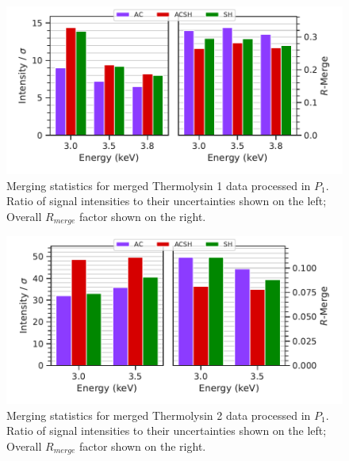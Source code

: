 \begin{figure}[]
    \centering
    \includegraphics{plots/exp1/tlys_9_P1/merged_stats.pdf}
    \caption{Merging statistics for merged Thermolysin 1 data processed in $P_1$. Ratio of signal intensities to their uncertainties shown on the left; Overall $R_{merge}$ factor shown on the right.}
    \label{fig:tlys_9_p1}
\end{figure}

\begin{figure}[]
    \centering
    \includegraphics{plots/exp1/tlys_2_P1/stats.pdf}
    \caption{Merging statistics for merged Thermolysin 2 data processed in $P_1$. Ratio of signal intensities to their uncertainties shown on the left; Overall $R_{merge}$ factor shown on the right.}
    \label{fig:tlys_2_p1}
\end{figure}
